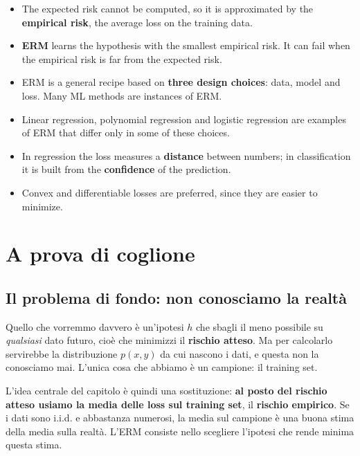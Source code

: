 \begin{itemize}
    \item The expected risk cannot be computed, so it is approximated by the \textbf{empirical risk}, the average loss on the training data.
    \item \textbf{ERM} learns the hypothesis with the smallest empirical risk. It can fail when the empirical risk is far from the expected risk.
    \item ERM is a general recipe based on \textbf{three design choices}: data, model and loss. Many ML methods are instances of ERM.
    \item Linear regression, polynomial regression and logistic regression are examples of ERM that differ only in some of these choices.
    \item In regression the loss measures a \textbf{distance} between numbers; in classification it is built from the \textbf{confidence} of the prediction.
    \item Convex and differentiable losses are preferred, since they are easier to minimize.
\end{itemize}





\section{A prova di coglione}

\subsection*{Il problema di fondo: non conosciamo la realtà}
Quello che vorremmo davvero è un'ipotesi $h$ che sbagli il meno possibile su \emph{qualsiasi} dato futuro, cioè che minimizzi il \textbf{rischio atteso}. Ma per calcolarlo servirebbe la distribuzione $p(x,y)$ da cui nascono i dati, e questa non la conosciamo mai. L'unica cosa che abbiamo è un campione: il training set.

L'idea centrale del capitolo è quindi una sostituzione: \textbf{al posto del rischio atteso usiamo la media delle loss sul training set}, il \textbf{rischio empirico}. Se i dati sono i.i.d. e abbastanza numerosi, la media sul campione è una buona stima della media sulla realtà. L'ERM consiste nello scegliere l'ipotesi che rende minima questa stima.

\begin{center}
\end{center}

